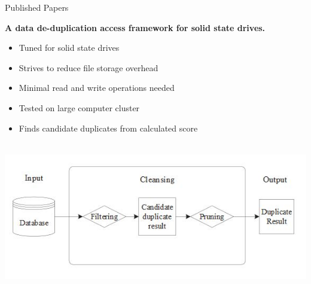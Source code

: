 \begin{frame}[t]{Published Papers}

  \hspace*{.6in}
  \begin{minipage}{3.5in}
  \begin{center}
	\vspace*{.1in}
	\textbf{A data de-duplication access framework for solid state drives.}\\
	\begin{itemize}
	\renewcommand{\labelitemi}{$\bullet$}
		\item Tuned for solid state drives
		\item Strives to reduce file storage overhead
		\item Minimal read and write operations needed
		\item Tested on large computer cluster
		\item Finds candidate duplicates from calculated score
	\end{itemize}
	\\

  \includegraphics[scale=.40]{duplicate.JPG}
  
  \end{center}
  \end{minipage}

\end{frame}